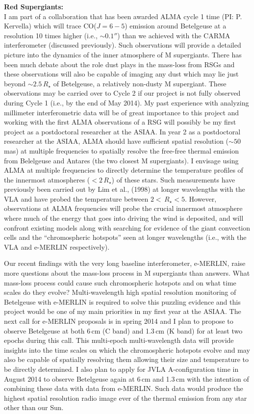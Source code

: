 \documentclass[11pt]{letter} %
\begin{document}
\textbf{Red Supergiants:}\\
I am part of a collaboration that has been awarded ALMA cycle 1 time (PI: P. Kervella) which will trace CO($J=6-5$) emission around Betelgeuse at a resolution 10 times higher (i.e., $\sim 0.1''$) than we achieved with the CARMA interferometer (discussed previously). Such observations will provide a detailed picture into the dynamics of the inner atmosphere of M supergiants. There has been much debate about the role dust plays in the mass-loss from RSGs and these observations will also be capable of imaging any dust which may lie just beyond $\sim 2.5\,R_{\star}$ of Betelgeuse, a relatively non-dusty M supergiant. These observations may be carried over to Cycle 2 if our project is not fully observed during Cycle 1 (i.e., by the end of May 2014). My past experience with analyzing millimeter interferometric data will be of great importance to this project and working with the first ALMA observations of a RSG will possibly be my first project as a postdoctoral researcher at the ASIAA. In year 2 as a postdoctoral researcher at the ASIAA, ALMA should have sufficient spatial resolution ($\sim 50$ mas) at multiple frequencies to spatially resolve the free-free thermal emission from Belelgeuse and Antares (the two closest M supergiants). I envisage using ALMA at multiple frequencies to directly determine the temperature profiles of the  innermost atmospheres ($<2\,R_{\star}$) of these stars. Such measurements have previously been carried out by Lim et al., (1998) at longer wavelengths with the VLA and have probed the temperature between $2 < \,R_{\star} < 5$. However, observations at ALMA frequencies will probe the crucial innermost atmosphere where much of the energy that goes into driving the wind is deposited, and will confront existing models along with searching for evidence of the giant convection cells and the ``chromospheric hotspots'' seen at longer wavelengths (i.e., with the VLA and e-MERLIN respectively).

Our recent findings with the very long baseline interferometer, e-MERLIN, raise more questions about the mass-loss process in M supergiants than answers. What mass-loss process could cause such chromospheric hotspots and on what time scales do they evolve? Multi-wavelength high spatial resolution monitoring of Betelgeuse with e-MERLIN is required to solve this puzzling evidence and this project would be one of my main priorities in my first year at the ASIAA. The next call for e-MERLIN proposals is in spring 2014 and I plan to propose to observe Betelgeuse at both 6\,cm (C band) and 1.3\,cm (K band) for at least two epochs during this call. This multi-epoch multi-wavelength data will provide insights into the time scales on which the chromospheric hotspots evolve and may also be capable of spatially resolving them allowing their size and temperature to be directly determined. I also plan to apply for JVLA A-configuration time in August 2014 to observe Betelgeuse again at 6\,cm and 1.3\,cm with the intention of combining these data with data from e-MERLIN. Such data would produce the highest spatial resolution radio image ever of the thermal emission from any star other than our Sun. 
\end{document}
